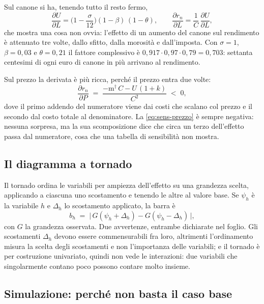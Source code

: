 \documentclass[11pt,a4paper]{article}
\theoremstyle{definition}
\theoremstyle{plain}
\begin{document}
Sul canone si ha, tenendo tutto il resto fermo,
\begin{equation}
\frac{\partial U}{\partial L} = \Big(1-\frac{\sigma}{12}\Big)(1-\beta)\,(1-\theta),
\qquad
\frac{\partial r_n}{\partial L} = \frac{1}{C}\,\frac{\partial U}{\partial L},
\label{eq:sens-canone}
\end{equation}
che mostra una cosa non ovvia: l'effetto di un aumento del canone sul rendimento è attenuato tre volte, dallo sfitto, dalla morosità e dall'imposta. Con $\sigma=1$, $\beta=0{,}03$ e $\theta=0{,}21$ il fattore complessivo è $0{,}917\cdot 0{,}97\cdot 0{,}79 = 0{,}703$: settanta centesimi di ogni euro di canone in più arrivano al rendimento.

Sul prezzo la derivata è più ricca, perché il prezzo entra due volte:
\begin{equation}
\frac{\partial r_n}{\partial P} \;=\; \frac{-\mathrm{m}^\dagger\,C - U\,(1+k)}{C^2} \;<\; 0 ,
\label{eq:sens-prezzo}
\end{equation}
dove il primo addendo del numeratore viene dai costi che scalano col prezzo e il secondo dal costo totale al denominatore. La \eqref{eq:sens-prezzo} è sempre negativa: nessuna sorpresa, ma la sua scomposizione dice che circa un terzo dell'effetto passa dal numeratore, cosa che una tabella di sensibilità non mostra.

\subsection{Il diagramma a tornado}

Il tornado ordina le variabili per ampiezza dell'effetto su una grandezza scelta, applicando a ciascuna uno scostamento e tenendo le altre al valore base. Se $\psi_h$ è la variabile $h$ e $\Delta_h$ lo scostamento applicato, la barra è
\begin{equation}
b_h \;=\; \big|\,G(\psi_h + \Delta_h) - G(\psi_h - \Delta_h)\,\big|,
\label{eq:tornado}
\end{equation}
con $G$ la grandezza osservata. Due avvertenze, entrambe dichiarate nel foglio. Gli scostamenti $\Delta_h$ devono essere commensurabili fra loro, altrimenti l'ordinamento misura la scelta degli scostamenti e non l'importanza delle variabili; e il tornado è per costruzione univariato, quindi non vede le interazioni: due variabili che singolarmente contano poco possono contare molto insieme.

\subsection{Simulazione: perché non basta il caso base}
\end{document}
